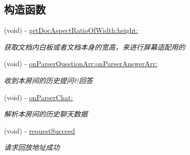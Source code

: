\subsection*{构造函数}
\begin{DoxyCompactItemize}
\item 
\mbox{\label{protocol_request_data_play_back_delegate_01-p_a4c6da05d856b8b7dc122a218c31d1bfb}} 
(void) -\/ \hyperlink{protocol_request_data_play_back_delegate_01-p_a4c6da05d856b8b7dc122a218c31d1bfb}{get\+Doc\+Aspect\+Ratio\+Of\+Width\+:height\+:}
\begin{DoxyCompactList}\small\item\em 获取文档内白板或者文档本身的宽高，来进行屏幕适配用的 \end{DoxyCompactList}\item 
\mbox{\label{protocol_request_data_play_back_delegate_01-p_aa50c576d7bc5fb8ef7f8d3ef1733aba1}} 
(void) -\/ \hyperlink{protocol_request_data_play_back_delegate_01-p_aa50c576d7bc5fb8ef7f8d3ef1733aba1}{on\+Parser\+Question\+Arr\+:on\+Parser\+Answer\+Arr\+:}
\begin{DoxyCompactList}\small\item\em 收到本房间的历史提问\&回答 \end{DoxyCompactList}\item 
\mbox{\label{protocol_request_data_play_back_delegate_01-p_ac1cdee5ae12908f95936f143c58a659d}} 
(void) -\/ \hyperlink{protocol_request_data_play_back_delegate_01-p_ac1cdee5ae12908f95936f143c58a659d}{on\+Parser\+Chat\+:}
\begin{DoxyCompactList}\small\item\em 解析本房间的历史聊天数据 \end{DoxyCompactList}\item 
\mbox{\label{protocol_request_data_play_back_delegate_01-p_a9cef2ecbbb3fa09ca031e06cd22982ea}} 
(void) -\/ \hyperlink{protocol_request_data_play_back_delegate_01-p_a9cef2ecbbb3fa09ca031e06cd22982ea}{request\+Succeed}
\begin{DoxyCompactList}\small\item\em 请求回放地址成功 \end{DoxyCompactList}\item 

\end{DoxyCompactItemize}
